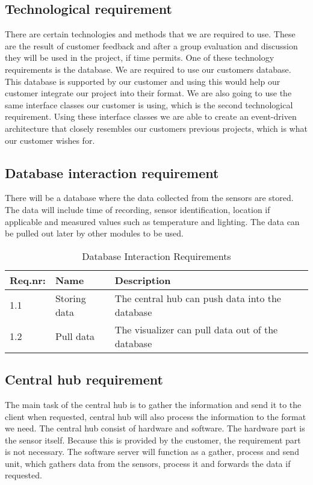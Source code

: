 \documentclass[../document]{subfiles}
\begin{document}
\subsection{Technological requirement}
There are certain technologies and methods that we are required to use. These are the result of customer feedback and after a group evaluation and discussion they will be used in the project, if time permits. One of these technology requirements is the database. We are required to use our customers database. This database is supported by our customer and using this would help our customer integrate our project into their format. We are also going to use the same interface classes our customer is using, which is the second technological requirement. Using these interface classes we are able to create an event-driven architecture that closely resembles our customers previous projects, which is what our customer wishes for.

\subsection{Database interaction requirement}
There will be a database where the data collected from the sensors are stored. The data will include time of recording, sensor identification, location if applicable and measured values such as temperature and lighting. The data can be pulled out later by other modules to be used.

\begin{table}[H]
\caption{Database Interaction Requirements}
\centering
\begin{tabularx}{\textwidth}{|l|X|X|}
\hline
Req.nr:
&Name
&Description
\\ \hline 1.1
&Storing data
&The central hub can push data into the database
\\ \hline 1.2
&Pull data
&The visualizer can pull data out of the database
\\ \hline 
\end{tabularx}
\end{table}

\subsection{Central hub requirement}
The main task of the central hub is to gather the information and send it to the client when requested, central hub will also process the information to the format we need. The central hub consist of hardware and software. The hardware part is the sensor itself. Because this is provided by the customer, the requirement part is not necessary. The software server will function as a gather, process and send unit, which gathers data from the sensors, process it and forwards the data if requested.
\end{document}
